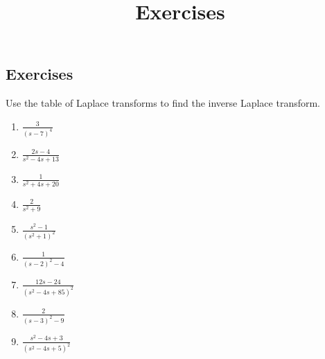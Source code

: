 \documentclass{ximera}
\title{Exercises} \license{CC BY-NC-SA 4.0}
\begin{document}
\begin{abstract}
\end{abstract}
\maketitle

\begin{onlineOnly}
\section*{Exercises}
\end{onlineOnly}

\begin{problem}\label{exer:8.2.1}
 Use the table of Laplace transforms  to find the inverse Laplace
transform.

\begin{enumerate}
    \item $\frac{3}{(s-7)^4}$
    \item $\frac{2s-4}{s^2-4s+13}$
    \item $\frac{1}{s^2+4s+20}$
    \item $\frac{2}{s^2+9}$
    \item $\frac{s^2-1}{(s^2+1)^2}$
    \item $\frac{1}{(s-2)^2-4}$
    \item $\frac{12s-24}{(s^2-4s+85)^2}$
    \item $\frac{2}{(s-3)^2-9}$
    \item $\frac{s^2-4s+3}{(s^2-4s+5)^2}$
\end{enumerate}
\end{problem}
\end{document}
